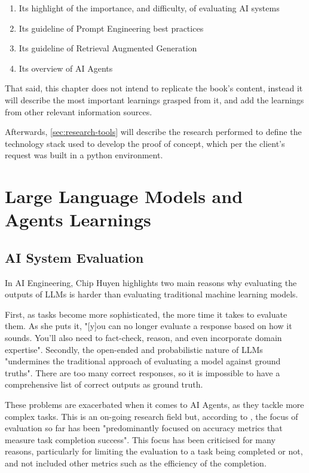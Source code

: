 \documentclass[a4paper]{report}
\begin{document}
\begin{enumerate}
    \item Its highlight of the importance, and difficulty, of evaluating AI systems
    \item Its guideline of Prompt Engineering best practices
    \item Its guideline of Retrieval Augmented Generation
    \item Its overview of AI Agents
\end{enumerate}

That said, this chapter does not intend to replicate the book's content, instead it will describe the most important learnings grasped from it, and add the learnings from other relevant information sources.

Afterwards, \autoref{sec:research-tools} will describe the research performed to define the technology stack used to develop the proof of concept, which per the client's request was built in a python environment.

\section{Large Language Models and Agents Learnings}
\label{sec:research-llms}

\subsection{AI System Evaluation}

In AI Engineering, Chip Huyen highlights two main reasons why evaluating the outputs of LLMs is harder than evaluating traditional machine learning models.

First, as tasks become more sophisticated, the more time it takes to evaluate them. As she puts it, "[y]ou can  no longer evaluate a response based on how it sounds. You'll also need to fact-check, reason, and even incorporate domain expertise".  Secondly, the open-ended and probabilistic nature of LLMs "undermines the traditional approach of evaluating a model against ground truths". There are too many correct responses, so it is impossible to have a comprehensive list of correct outputs as ground truth.

These problems are exacerbated when it comes to AI Agents, as they tackle more complex tasks. This is an on-going research field but, according to \cite{krishnan2025aiagentsevolutionarchitecture}, the focus of evaluation so far has been "predominantly focused on accuracy metrics that measure task completion success". This focus has been criticised for many reasons, particularly for limiting the evaluation to a task being completed or not, and not included other metrics such as the efficiency of the completion.
\end{document}
